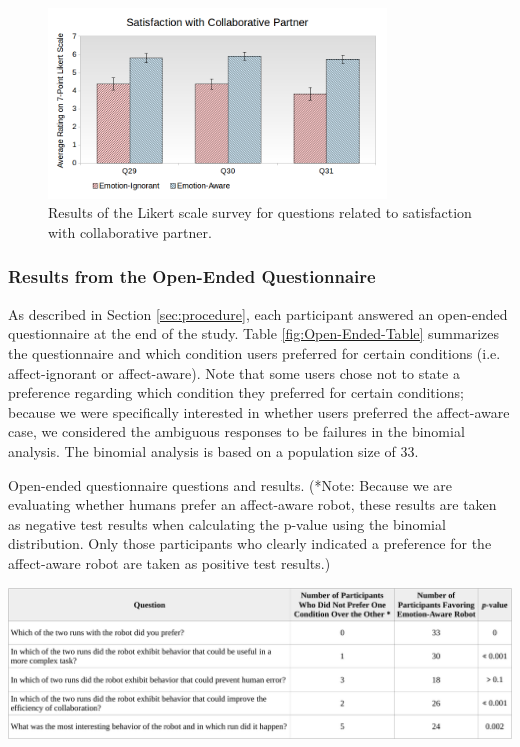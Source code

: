 \documentclass[12pt]{report}
\begin{document}
\begin{figure}
\centering
\includegraphics[width=0.8\textwidth]{figure/Overall-Satisfaction.png}
\caption{Results of the Likert scale survey for questions related to
satisfaction with collaborative partner.}
\label{fig:overall-satisfaction}
\end{figure}

\vspace*{-5mm}
\subsubsection{Results from the Open-Ended Questionnaire} 
\label{sec:Open-Ended}
As described in Section \ref{sec:procedure}, each participant answered an
open-ended questionnaire at the end of the study. Table
\ref{fig:Open-Ended-Table} summarizes the questionnaire and which condition
users preferred for certain conditions (i.e. affect-ignorant or affect-aware).
Note that some users chose not to state a preference regarding which condition
they preferred for certain conditions; because we were specifically interested
in whether users preferred the affect-aware case, we considered the ambiguous
responses to be failures in the binomial analysis. The binomial analysis is
based on a population size of 33.

\begin{table}[t]
  \centering
  \caption{Open-ended questionnaire questions and results. (*Note: Because we
  are evaluating whether humans prefer an affect-aware robot, these results are
  taken as negative test results when calculating the p-value using the binomial
  distribution. Only those participants who clearly indicated a preference for
  the affect-aware robot are taken as positive test results.)}
  \label{fig:Open-Ended-Table}
  \vspace*{-3mm}
  \includegraphics[width=1\textwidth]{figure/table2-croped.pdf}
\end{table}
\end{document}
